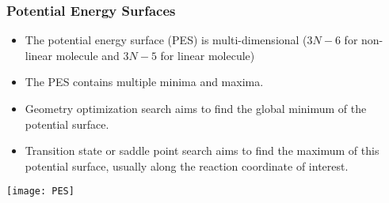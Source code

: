 \documentclass[slidestop,mathserif,compress,xcolor=svgnames]{beamer}
\begin{document}
\begin{frame}
\frametitle{\small Potential Energy Surfaces}
\footnotesize{
\begin{itemize}
\item The potential energy surface (PES) is multi-dimensional ($3N-6$ for non-linear molecule and $3N-5$ for linear molecule)
\item The PES contains multiple minima and maxima.
\item Geometry optimization search aims to find the global minimum of the potential surface.
\item Transition state or saddle point search aims to find the maximum of this potential surface, usually along the reaction coordinate of interest.
\end{itemize}
\begin{center}
\texttt{[image: PES]}
\end{center}
}
\end{frame}
\end{document}
